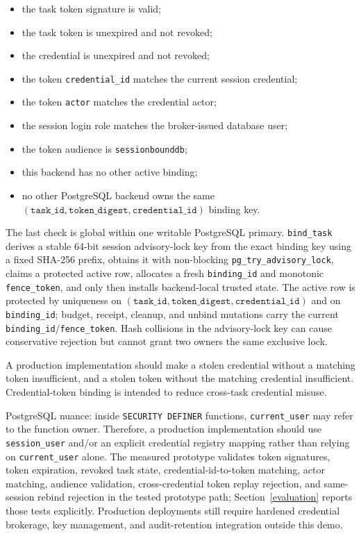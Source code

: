 \documentclass[journal]{IEEEtran}
\providecommand{\tightlist}{%
  \setlength{\itemsep}{0pt}\setlength{\parskip}{0pt}}
\begin{document}
\begin{itemize}
\tightlist
\item
  the task token signature is valid;
\item
  the task token is unexpired and not revoked;
\item
  the credential is unexpired and not revoked;
\item
  the token \texttt{credential\_id} matches the current session
  credential;
\item
  the token \texttt{actor} matches the credential actor;
\item
  the session login role matches the broker-issued database user;
\item
  the token audience is \texttt{sessionbounddb};
\item
  this backend has no other active binding;
\item
  no other PostgreSQL backend owns the same
  \((\texttt{task\_id},\texttt{token\_digest},\texttt{credential\_id})\)
  binding key.
\end{itemize}

The last check is global within one writable PostgreSQL primary.
\texttt{bind\_task} derives a stable 64-bit session advisory-lock key
from the exact binding key using a fixed SHA-256 prefix, obtains it with
non-blocking \texttt{pg\_try\_advisory\_lock}, claims a protected active
row, allocates a fresh \texttt{binding\_id} and monotonic
\texttt{fence\_token}, and only then installs backend-local trusted
state. The active row is protected by uniqueness on
\((\texttt{task\_id},\texttt{token\_digest},\texttt{credential\_id})\)
and on \texttt{binding\_id}; budget, receipt, cleanup, and unbind
mutations carry the current \texttt{binding\_id}/\texttt{fence\_token}.
Hash collisions in the advisory-lock key can cause conservative
rejection but cannot grant two owners the same exclusive lock.

A production implementation should make a stolen credential without a
matching token insufficient, and a stolen token without the matching
credential insufficient. Credential-token binding is intended to reduce
cross-task credential misuse.

PostgreSQL nuance: inside \texttt{SECURITY\ DEFINER} functions,
\texttt{current\_user} may refer to the function owner. Therefore, a
production implementation should use \texttt{session\_user} and/or an
explicit credential registry mapping rather than relying on
\texttt{current\_user} alone. The measured prototype validates token
signatures, token expiration, revoked task state, credential-id-to-token
matching, actor matching, audience validation, cross-credential token
replay rejection, and same-session rebind rejection in the tested
prototype path; Section~\ref{evaluation} reports those tests explicitly.
Production deployments still require hardened credential brokerage, key
management, and audit-retention integration outside this demo.
\end{document}
